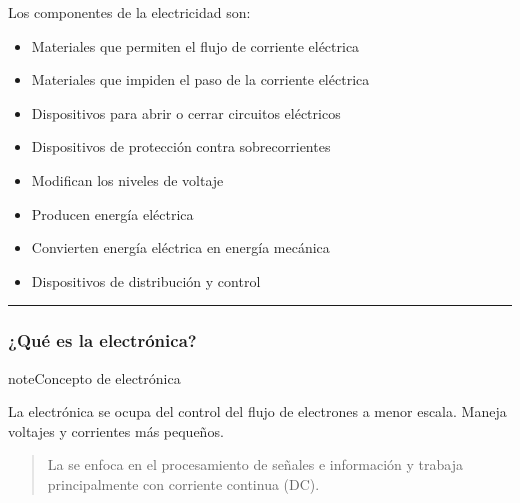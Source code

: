 \documentclass[letterpaper,10pt,spanish]{sphinxmanual}
\begin{document}
\sphinxAtStartPar
Los componentes de la electricidad son:
\begin{itemize}
\item {} 
\sphinxAtStartPar
{} Materiales que permiten el flujo de corriente eléctrica

\item {} 
\sphinxAtStartPar
{} Materiales que impiden el paso de la corriente eléctrica

\item {} 
\sphinxAtStartPar
{} Dispositivos para abrir o cerrar circuitos eléctricos

\item {} 
\sphinxAtStartPar
{} Dispositivos de protección contra sobre\sphinxhyphen{}corrientes

\item {} 
\sphinxAtStartPar
{} Modifican los niveles de voltaje

\item {} 
\sphinxAtStartPar
{} Producen energía eléctrica

\item {} 
\sphinxAtStartPar
{} Convierten energía eléctrica en energía mecánica

\item {} 
\sphinxAtStartPar
{} Dispositivos de distribución y control

\end{itemize}


\bigskip\hrule\bigskip



\subsubsection{¿Qué es la electrónica?}
\label{\detokenize{1_guias/10informatica/G1004:que-es-la-electronica}}
\begin{sphinxadmonition}{note}{Concepto de electrónica}

\sphinxAtStartPar
La electrónica se ocupa del control del flujo de electrones a menor escala. Maneja voltajes y corrientes más pequeños.
\end{sphinxadmonition}
\begin{quote}

\sphinxAtStartPar
La  se enfoca en el procesamiento de señales e información y trabaja principalmente con corriente continua (DC).
\end{quote}
\end{document}
